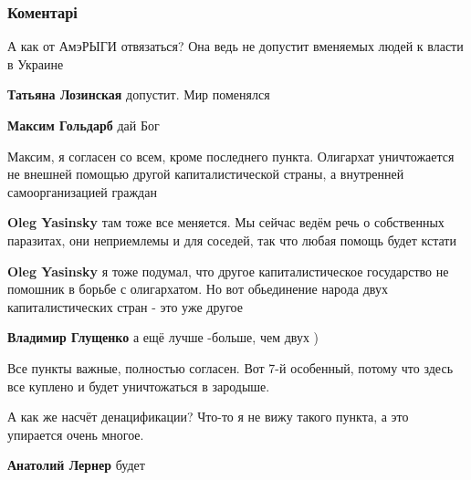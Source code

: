  
 
 
 
 
\subsubsection{Коментарі}

\begin{itemize} %
А как от АмэРЫГИ отвязаться? Она ведь не допустит вменяемых людей к власти в Украине

\begin{itemize} %
\textbf{Татьяна Лозинская} допустит. Мир поменялся

\textbf{Максим Гольдарб} дай Бог
\end{itemize} %


Максим, я согласен со всем, кроме последнего пункта. Олигархат уничтожается не
внешней помощью другой капиталистической страны, а внутренней самоорганизацией
граждан

\begin{itemize} %
\textbf{Oleg Yasinsky} там тоже все меняется. Мы сейчас ведём речь о собственных паразитах, они неприемлемы и для соседей, так что любая помощь будет кстати

\textbf{Oleg Yasinsky} я тоже подумал, что другое капиталистическое государство не помошник в борьбе с олигархатом. Но вот обьединение народа двух капиталистических стран - это уже другое

\textbf{Владимир Глущенко} а ещё лучше -больше, чем двух )
\end{itemize} %

Все пункты важные, полностью согласен. Вот 7-й особенный, потому что здесь все куплено и будет уничтожаться в зародыше.

А как же насчёт денацификации? Что-то я не вижу такого пункта, а это упирается очень многое.

\begin{itemize} %
\textbf{Анатолий Лернер} будет


\end{itemize}
\end{itemize}
